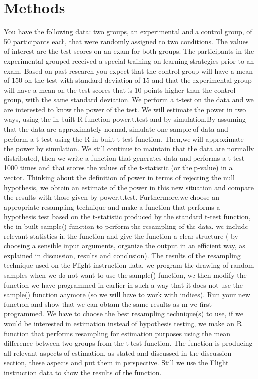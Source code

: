 \documentclass{article}
\begin{document}
\section{Methods}
You have the following data: two groups, an experimental and a control group, of 50 participants each, that were randomly assigned to two conditions. The values of interest are the test scores on an exam for both groups. The participants in the experimental grouped received a special training on learning strategies prior to an exam. Based on past research you expect that the control group will have a mean of 150 on the test with standard deviation of 15 and that the experimental group will have a mean on the test scores that is 10 points higher than the control group, with the same standard deviation. We perform a t-test on the data and we are interested to know the power of the test. We will estimate the power in two ways, using the in-built R function power.t.test and by simulation.By assuming that the data are approximately normal, simulate one sample of data and perform a t-test using the R in-built t-test function. Then,we will approximate the power by simulation. We still continue to maintain that the data are normally distributed, then we write a function that generates data and performs a t-test 1000 times and that stores the values of the t-statistic (or the p-value) in a vector. Thinking about the definition of power in terms of rejecting the null hypothesis, we obtain an estimate of the power in this new situation and compare the results with those given by power.t.test. 
Furthermore,we choose an appropriate resampling technique and make a function that performs a hypothesis test based on the t-statistic produced by the standard t-test function, the in-built sample() function to perform the resampling of the data. we include relevant statistics in the function and give the function a clear structure ( by choosing a sensible input arguments, organize the output in an efficient way, as explained in discussion, results and conclusion). The results of the resampling technique used on the Flight instruction data. we program the drawing of random samples when we do not want to use the sample() function, we then modify the function we have programmed in earlier in such a way that it does not use the sample() function anymore (so we will have to work with indices). Run your new function and show that we can obtain the same results as in we first programmed. 
We have to choose the best resampling technique(s) to use, if we would be interested in estimation instead of hypothesis testing, we make an R function that performs resampling for estimation purposes using the mean difference between two groups from the t-test function. The function is producing all relevant aspects of estimation, as stated and discussed in the discussion section, these aspects and put them in perspective. Still we use the Flight instruction data to show the results of the function.
\end{document}
